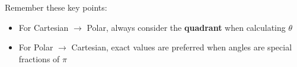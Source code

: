 \begin{remark}
  Remember these key points:
  \begin{itemize}
    \item For Cartesian \(\to \) Polar, always consider the \textbf{quadrant} when calculating $\theta$
    \item For Polar \(\to \) Cartesian, exact values are preferred when angles are special fractions of $\pi$
  \end{itemize}
\end{remark}

